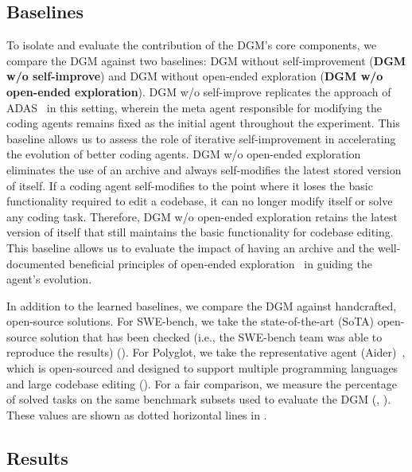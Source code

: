 \documentclass{article}
\begin{document}
\subsection{Baselines}
\label{sec:baselines}

To isolate and evaluate the contribution of the DGM's core components, we compare the DGM against two baselines: DGM without self-improvement (\textbf{DGM w/o self-improve}) and DGM without open-ended exploration (\textbf{DGM w/o open-ended exploration}). DGM w/o self-improve replicates the approach of ADAS~\citep{hu2025automated} in this setting, wherein the meta agent responsible for modifying the coding agents remains fixed as the initial agent throughout the experiment. This baseline allows us to assess the role of iterative self-improvement in accelerating the evolution of better coding agents. DGM w/o open-ended exploration eliminates the use of an archive and always self-modifies the latest stored version of itself. If a coding agent self-modifies to the point where it loses the basic functionality required to edit a codebase, it can no longer modify itself or solve any coding task. Therefore, DGM w/o open-ended exploration retains the latest version of itself that still maintains the basic functionality for codebase editing. This baseline allows us to evaluate the impact of having an archive and the well-documented beneficial principles of open-ended exploration~\citep{clune2019ai, stanley2015greatness, zhang2024omni, fernandopromptbreeder, lee2020learning, samvelyan2024rainbow, colas2022autotelic} in guiding the agent's evolution.

In addition to the learned baselines, we compare the DGM against handcrafted, open-source solutions. For SWE-bench, we take the state-of-the-art (SoTA) open-source solution that has been checked (i.e., the SWE-bench team was able to reproduce the results) (). For Polyglot, we take the representative agent (Aider)~\citep{aider2024}, which is open-sourced and designed to support multiple programming languages and large codebase editing (). For a fair comparison, we measure the percentage of solved tasks on the same benchmark subsets used to evaluate the DGM (, ). These values are shown as dotted horizontal lines in .

\subsection{Results}
\label{sec:results}
\end{document}

